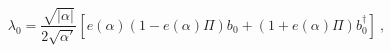 \begin{equation}
\lambda_{0} = \frac{\sqrt{|\alpha|}}{2 \sqrt{\alpha '}} 
\left[ e(\alpha) (1 - e(\alpha) \Pi ) b_0 + 
(1 + e(\alpha) \Pi) b_{0}^{\dagger} \right]~,
\label{la0sv}
\end{equation}

